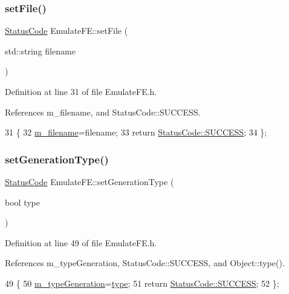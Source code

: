 \subsubsection{\texorpdfstring{set\+File()}{setFile()}}
{\footnotesize\ttfamily \hyperlink{classStatusCode}{Status\+Code} Emulate\+F\+E\+::set\+File (\begin{DoxyParamCaption}\item[{std\+::string}]{filename }\end{DoxyParamCaption})\hspace{0.3cm}{\ttfamily [inline]}}



Definition at line 31 of file Emulate\+F\+E.\+h.



References m\+\_\+filename, and Status\+Code\+::\+S\+U\+C\+C\+E\+SS.


\begin{DoxyCode}
31                                          \{
32     \hyperlink{classEmulateFE_a103fedea9eb5d3963573f9120cb81a68}{m\_filename}=filename;
33     \textcolor{keywordflow}{return} \hyperlink{classStatusCode_a6f565cbeadc76d14c72f047e5e85eb4badd0da38d3ba0d922efd1f4619bc37ad8}{StatusCode::SUCCESS};
34   \};
\end{DoxyCode}
\mbox{\label{classEmulateFE_ac4592687749d8a457430911ddf8f5e76}} 
\subsubsection{\texorpdfstring{set\+Generation\+Type()}{setGenerationType()}}
{\footnotesize\ttfamily \hyperlink{classStatusCode}{Status\+Code} Emulate\+F\+E\+::set\+Generation\+Type (\begin{DoxyParamCaption}\item[{bool}]{type }\end{DoxyParamCaption})\hspace{0.3cm}{\ttfamily [inline]}}



Definition at line 49 of file Emulate\+F\+E.\+h.



References m\+\_\+type\+Generation, Status\+Code\+::\+S\+U\+C\+C\+E\+SS, and Object\+::type().


\begin{DoxyCode}
49                                           \{
50     \hyperlink{classEmulateFE_aa8bd0aa42cc5f3d52930408807b3067c}{m\_typeGeneration}=\hyperlink{classObject_a84f99f70f144a83e1582d1d0f84e4e62}{type};
51     \textcolor{keywordflow}{return} \hyperlink{classStatusCode_a6f565cbeadc76d14c72f047e5e85eb4badd0da38d3ba0d922efd1f4619bc37ad8}{StatusCode::SUCCESS};
52   \};
\end{DoxyCode}
\mbox{\label{classObject_a398fe08cba594a0ce6891d59fe4f159f}} 
